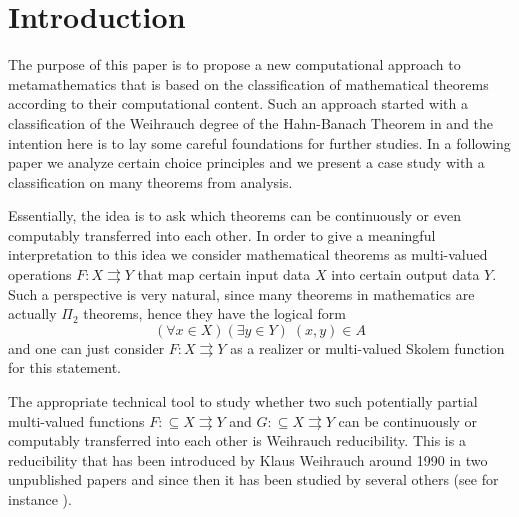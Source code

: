 \documentclass[jsl,10pt]{noasl}
\def\In{\subseteq}
\def\mto{\rightrightarrows}
\begin{document}


\maketitle

\section{Introduction}

The purpose of this paper is to propose a new computational approach to metamathematics
that is based on the classification of mathematical theorems according to their computational content. 
Such an approach started with a classification of the Weihrauch degree of the 
Hahn-Banach Theorem in \cite{GM09} and the intention here
is to lay some careful foundations for further studies.
In a following paper \cite{BG09b} we analyze certain choice principles and 
we present a case study with a classification on many theorems from analysis.

Essentially, the idea is to ask which theorems can be continuously or even computably transferred
into each other. In order to give a meaningful interpretation to this idea
we consider mathematical theorems as multi-valued operations $F:X\mto Y$ that 
map certain input data $X$ into certain output data $Y$. Such a perspective
is very natural, since many theorems in mathematics are actually $\Pi_2$ theorems,
hence they have the logical form
\[(\forall x\in X)(\exists y\in Y)\;(x,y)\in A\]
and one can just consider $F:X\mto Y$ as a realizer or multi-valued Skolem
function for this statement. 

The appropriate technical tool to study whether two such potentially partial multi-valued functions 
$F:\In X\mto Y$ and $G:\In X\mto Y$ can be continuously or computably transferred
into each other is Weihrauch reducibility.
This is a reducibility that has been introduced by Klaus Weihrauch around
1990 in two unpublished papers \cite{Wei92a,Wei92c} and since then
it has been studied by several others (see for instance \cite{Ste89,Myl92,Her96,Bra99,Bra05,Myl06,GM09,BG09b,Pau09}).
\end{document}
